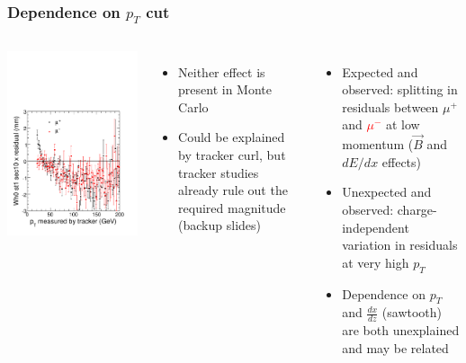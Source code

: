 \documentclass[compress]{beamer}
\begin{document}
\begin{frame}
\frametitle{Dependence on $p_T$ cut}

\begin{columns}
\vspace{0.1 cm}
\includegraphics[width=\linewidth]{resid_vs_pt.pdf}

\begin{itemize}
\item Neither effect is present in Monte Carlo
\item Could be explained by tracker curl, but tracker studies already rule out the required magnitude (backup slides)
\end{itemize}

\begin{itemize}
\item Expected and observed: splitting in residuals between $\mu^+$ and \textcolor{red}{$\mu^-$} at low momentum ($\vec{B}$ and $dE/dx$ effects)
\item Unexpected and observed: charge-independent variation in residuals at very high $p_T$
\item Dependence on $p_T$ and $\frac{dx}{dz}$ (sawtooth) are both unexplained and may be related
\end{itemize}


\end{columns}
\end{frame}
\end{document}
